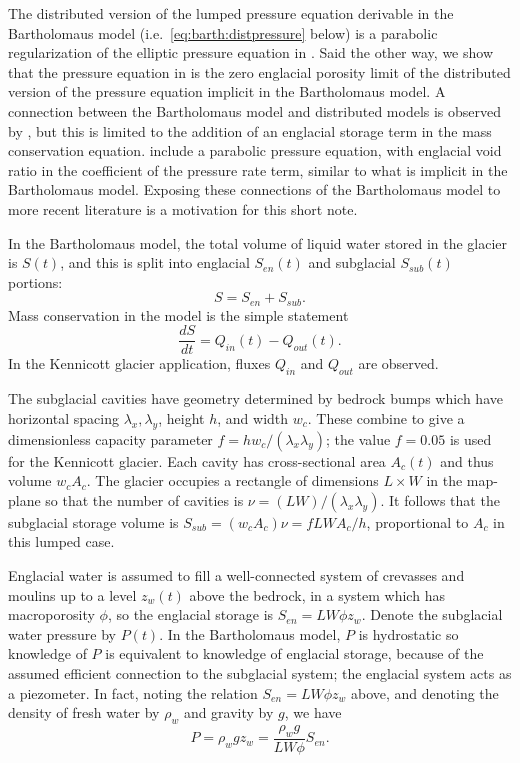 \documentclass[twocolumn]{igs}
\begin{document}
The distributed version of the lumped pressure equation derivable in the Bartholomaus model (i.e.~\eqref{eq:barth:distpressure} below) is a parabolic regularization of the elliptic pressure equation in \cite{Schoofetal2012}.  Said the other way, we show that the pressure equation in \cite{Schoofetal2012} is the zero englacial porosity limit of the distributed version of the pressure equation implicit in the Bartholomaus model.  A connection between the Bartholomaus model and distributed models is observed by \cite{Hewitt2013}, but this is limited to the addition of an englacial storage term in the mass conservation equation.  \cite{Werderetal2013} include a parabolic pressure equation, with englacial void ratio in the coefficient of the pressure rate term, similar to what is implicit in the Bartholomaus model.  Exposing these connections of the Bartholomaus model to more recent literature is a motivation for this short note.

In the Bartholomaus model, the total volume of liquid water stored in the glacier is $S(t)$, and this is split into englacial $S_{en}(t)$ and subglacial $S_{sub}(t)$ portions:
\begin{equation}
S = S_{en} + S_{sub}.  \label{eq:barth:kinematics}
\end{equation}
Mass conservation in the model is the simple statement \citep{Bartholomausetal2008}
\begin{equation}
\frac{dS}{dt} = Q_{in}(t) - Q_{out}(t). \label{eq:barth:massconserve}
\end{equation}
In the Kennicott glacier application, fluxes $Q_{in}$ and $Q_{out}$ are observed.

The subglacial cavities have geometry determined by bedrock bumps which have horizontal spacing $\lambda_x,\lambda_y$, height $h$, and width $w_c$.  These combine to give a dimensionless capacity parameter $f=h w_c/(\lambda_x \lambda_y)$; the value $f=0.05$ is used for the Kennicott glacier.  Each cavity has cross-sectional area $A_c(t)$ and thus volume $w_c A_c$.  The glacier occupies a rectangle of dimensions $L\times W$ in the map-plane so that the number of cavities is $\nu = (LW)/(\lambda_x\lambda_y)$.  It follows that the subglacial storage volume is $S_{sub} = (w_c A_c) \nu = f L W A_c / h$, proportional to $A_c$ in this lumped case.

Englacial water is assumed to fill a well-connected system of crevasses and moulins up to a level $z_w(t)$ above the bedrock, in a system which has macroporosity $\phi$, so the englacial storage is $S_{en}=L W \phi z_w$.  Denote the subglacial water pressure by $P(t)$.  In the Bartholomaus model, $P$ is hydrostatic so knowledge of $P$ is equivalent to knowledge of englacial storage, because of the assumed efficient connection to the subglacial system; the englacial system acts as a piezometer.  In fact, noting the relation $S_{en}=L W \phi z_w$ above, and denoting the density of fresh water by $\rho_w$ and gravity by $g$, we have
\begin{equation}
P = \rho_w g z_w = \frac{\rho_w g}{LW\phi} S_{en}.  \label{eq:barth:englacialpressure}
\end{equation}
\end{document}
